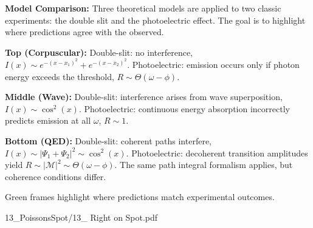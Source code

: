 \begin{SideNotePage}{
  \textbf{Model Comparison:} Three theoretical models are applied to two classic experiments: the double slit and the photoelectric effect. The goal is to highlight where predictions agree with the observed. \par

  \textbf{Top (Corpuscular):} Double-slit: no interference, \( I(x) \sim e^{-(x - x_1)^2} + e^{-(x - x_2)^2} \). Photoelectric: emission occurs only if photon energy exceeds the threshold, \( R \sim \Theta(\omega - \phi) \). \par

  \textbf{Middle (Wave):} Double-slit: interference arises from wave superposition, \( I(x) \sim \cos^2(x) \). Photoelectric: continuous energy absorption incorrectly predicts emission at all \( \omega \), \( R \sim 1 \). \par

  \textbf{Bottom (QED):} Double-slit: coherent paths interfere, \( I(x) \sim |\Psi_1 + \Psi_2|^2 \sim \cos^2(x) \). Photoelectric: decoherent transition amplitudes yield \( R \sim |\mathcal{M}|^2 \sim \Theta(\omega - \phi) \). The same path integral formalism applies, but coherence conditions differ.

  Green frames highlight where predictions match experimental outcomes. \par
}{13_PoissonsSpot/13_ Right on Spot.pdf}
\end{SideNotePage}
